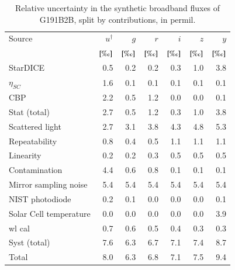 \begin{table}
  \centering
  \caption{Relative uncertainty in the synthetic broadband fluxes of
    G191B2B, split by contributions, in permil.}
  \label{tab:budget}
  \begin{tabular}{@{}l@{}rrrrrr@{}}
    \toprule
    \toprule
    Source & $u^\dag$ & $g$ & $r$ & $i$ & $z$ & $y$ \\
    & $[\text{\textperthousand}]$ & $[\text{\textperthousand}]$ & $[\text{\textperthousand}]$ & $[\text{\textperthousand}]$ & $[\text{\textperthousand}]$ & $[\text{\textperthousand}]$\\
    \midrule
    StarDICE & 0.5 & 0.2 & 0.2 & 0.3 & 1.0 & 3.8 \\
    $\eta_{SC}$ & 1.6 & 0.1 & 0.1 & 0.1 & 0.1 & 0.1 \\
    CBP & 2.2 & 0.5 & 1.2 & 0.0 & 0.0 & 0.1 \\
    \midrule
    Stat (total) & 2.7 & 0.5 & 1.2 & 0.3 & 1.0 & 3.8 \\
    \midrule
    Scattered light & 2.7 & 3.1 & 3.8 & 4.3 & 4.8 & 5.3 \\
    Repeatability & 0.8 & 0.4 & 0.5 & 1.1 & 1.1 & 1.1 \\
    Linearity & 0.2 & 0.2 & 0.3 & 0.5 & 0.5 & 0.5 \\
    Contamination & 4.4 & 0.6 & 0.8 & 0.1 & 0.1 & 0.1 \\
    Mirror sampling noise & 5.4 & 5.4 & 5.4 & 5.4 & 5.4 & 5.4 \\
    NIST photodiode & 0.2 & 0.1 & 0.0 & 0.0 & 0.0 & 0.1 \\
    Solar Cell temperature & 0.0 & 0.0 & 0.0 & 0.0 & 0.0 & 3.9 \\
    wl cal & 0.7 & 0.6 & 0.5 & 0.4 & 0.3 & 0.3 \\
    \midrule
    Syst (total) & 7.6 & 6.3 & 6.7 & 7.1 & 7.4 & 8.7 \\
    \midrule
    Total & 8.0 & 6.3 & 6.8 & 7.1 & 7.5 & 9.4 \\
    \bottomrule
  \end{tabular}
\end{table}

